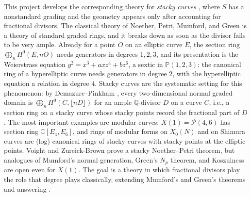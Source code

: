 \documentclass[11pt,reqno]{amsart}
\theoremstyle{remark}
\newcommand{\CC}{\mathbb{C}}
\newcommand{\PP}{\mathbb{P}}
\newcommand{\QQ}{\mathbb{Q}}
\newcommand{\cP}{\mathcal{P}}
\begin{document}
This project develops the corresponding theory for \emph{stacky curves} \cite{abramovichVistoli02,cadman07,AGV08}, where $S$ has a nonstandard grading and the geometry appears only after accounting for fractional divisors. The classical theory of Noether, Petri, Mumford, and Green is a theory of standard graded rings, and it breaks down as soon as the divisor fails to be very ample. Already for a point $O$ on an elliptic curve $E$, the section ring $\bigoplus_n H^0(E,nO)$ needs generators in degrees $1,2,3$, and its presentation is the Weierstrass equation $y^2=x^3+axz^4+bz^6$, a sextic in $\PP(1,2,3)$; the canonical ring of a hyperelliptic curve needs generators in degree $2$, with the hyperelliptic equation a relation in degree $4$. Stacky curves are the systematic setting for this phenomenon: by Demazure--Pinkham \cite{pinkham77,demazure88,watanabe81}, every two-dimensional normal graded domain is $\bigoplus_n H^0(C,\lfloor nD\rfloor)$ for an ample $\QQ$-divisor $D$ on a curve $C$, i.e., a section ring on a stacky curve whose stacky points record the fractional part of $D$. The most important examples are modular curves: $X(1)=\cP(4,6)$ has section ring $\CC[E_4,E_6]$, and rings of modular forms on $X_0(N)$ and on Shimura curves are (log) canonical rings of stacky curves with stacky points at the elliptic points. Voight and Zureick-Brown \cite{voightZurieckBrown22} prove a stacky Noether--Petri theorem, but analogues of Mumford's normal generation, Green's $N_p$ theorem, and Koszulness are open even for $X(1)$. The goal is a theory in which fractional divisors play the role that degree plays classically, extending Mumford's and Green's theorems and answering \cite[Question~7.7]{brownErman25}.
\end{document}
